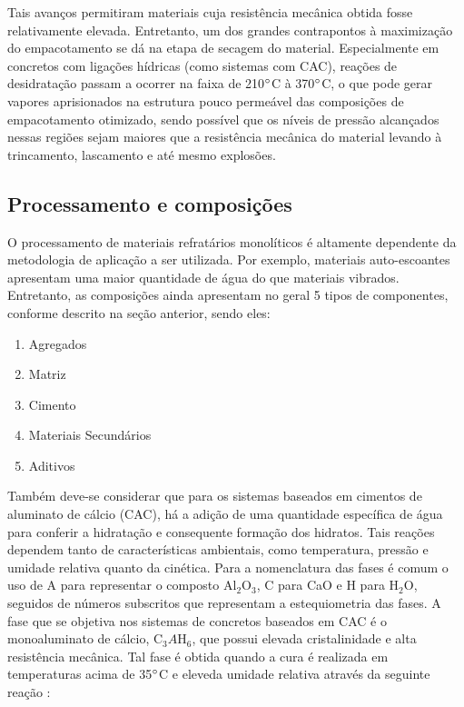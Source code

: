     Tais avanços permitiram materiais cuja resistência mecânica obtida fosse relativamente elevada. Entretanto, um dos grandes contrapontos à maximização do empacotamento se dá na etapa de secagem do material. Especialmente em concretos com ligações hídricas (como sistemas com CAC), reações de desidratação passam a ocorrer na faixa de 210$\degree$C à 370$\degree$C, o que pode gerar vapores aprisionados na estrutura pouco permeável das composições de empacotamento otimizado, sendo possível que os níveis de pressão alcançados nessas regiões sejam maiores que a resistência mecânica do material levando à trincamento, lascamento e até mesmo explosões.
    \subsection{Processamento e composições}
      O processamento de materiais refratários monolíticos é altamente
      dependente da metodologia de aplicação a ser utilizada. Por exemplo,
      materiais auto-escoantes apresentam uma maior quantidade de água do que
      materiais vibrados. Entretanto, as composições ainda apresentam no geral 5
      tipos de componentes, conforme descrito na seção anterior, sendo eles:

\begin{enumerate}
\item Agregados
\item Matriz
\item Cimento
\item Materiais Secundários
\item Aditivos
\end{enumerate}

	Também deve-se considerar que para os sistemas baseados em cimentos de
  aluminato de cálcio (CAC), há a adição de uma quantidade específica de água
  para conferir a hidratação e consequente formação dos hidratos. Tais reações dependem tanto de características ambientais, como temperatura, pressão e umidade relativa quanto da cinética.
    Para a nomenclatura das fases é comum o uso de A para representar o composto Al$_2$O$_3$, C para CaO e H para H$_2$O, seguidos de números subscritos que representam a estequiometria das fases.
    A fase que se objetiva nos sistemas de concretos baseados em CAC é o
    monoaluminato de cálcio, C$_3A$H${_6}$, que possui elevada cristalinidade e
    alta resistência mecânica. Tal fase é obtida quando a cura é realizada em
    temperaturas acima de 35$\degree $C e eleveda umidade relativa através da
    seguinte reação \cite{oriol1995}:

